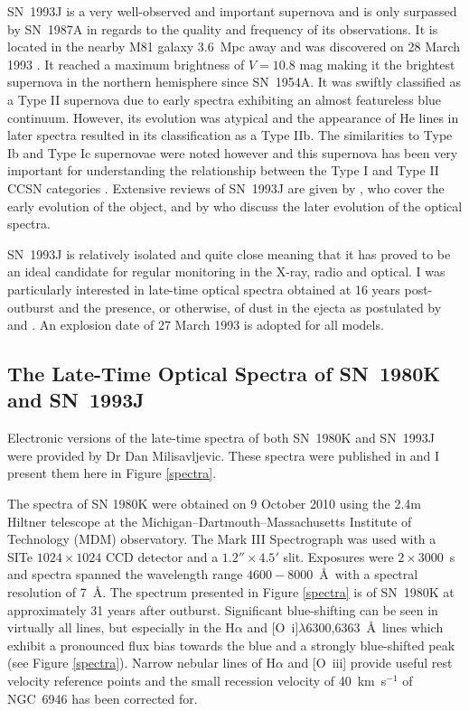SN~1993J is a very well-observed and important supernova and is only surpassed  by SN~1987A in regards to the quality and frequency of its observations.  It is located in the nearby M81 galaxy 3.6~Mpc away \citep{Freedman1994} and was discovered on 28 March 1993 \citep{Ripero1993}.  It reached a maximum brightness of $V=10.8$ mag making it the brightest supernova in the northern hemisphere since SN~1954A. It was swiftly classified as a Type II supernova due to early spectra exhibiting an almost featureless blue continuum.  However, its evolution was atypical and the appearance of He lines in later spectra resulted in its classification as a Type IIb.  The similarities to Type Ib and Type Ic supernovae were noted however and this supernova has been very important for understanding the relationship between the Type I and Type II CCSN categories \citep{Fillipenko1993,Garnavich1993}.  Extensive reviews of SN~1993J are given by \citet{Wheeler1996}, who cover the early evolution of the object, and by \citet{Matheson2000a,Matheson2000b} who discuss the later evolution of the optical spectra.  

SN~1993J is relatively isolated and quite close meaning that it has proved to be an ideal candidate for regular monitoring in the X-ray, radio and optical.  I was particularly interested in late-time optical spectra obtained at 16 years post-outburst and the presence, or otherwise, of dust in the ejecta as postulated by \citet{Fransson2005} and \citet{Milisavljevic2012}.  An explosion date of 27 March 1993 \citep{Baron1993} is adopted for all models.

\subsection{The Late-Time Optical Spectra of SN~1980K and SN~1993J}

Electronic versions of the late-time spectra of both SN~1980K and SN~1993J were provided by Dr Dan Milisavljevic.  These spectra were published in \citet{Milisavljevic2012} and I present them here in Figure \ref{spectra}.

The spectra of SN 1980K were obtained on 9 October 2010 using the  2.4m Hiltner telescope at the Michigan--Dartmouth--Massachusetts Institute of Technology (MDM) observatory. The Mark III Spectrograph was used with a SITe $1024 \times 1024$ CCD detector and a $1.2'' \times 4.5'$ slit. Exposures were $2 \times 3000$~s and spectra spanned the wavelength range $4600-8000$~\AA\ with a spectral resolution of 7~\AA. The spectrum presented in Figure \ref{spectra} is of SN~1980K at approximately 31 years after outburst. Significant blue-shifting can be seen in virtually all lines, but especially in the H$\alpha$ and [O~{\sc i}]$\lambda$6300,6363~\AA\ lines which exhibit a pronounced flux bias towards the blue and a strongly blue-shifted peak (see Figure \ref{spectra}).  Narrow nebular lines of H$\alpha$ and [O~{\sc iii}] provide useful rest velocity reference points and the small recession velocity of 40~km~s$^{-1}$ of NGC~6946 has been corrected for.


